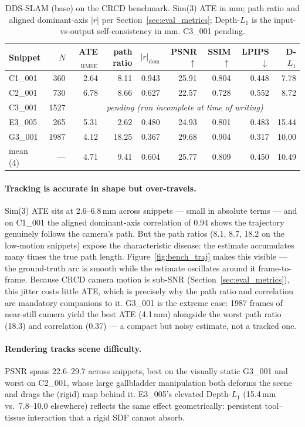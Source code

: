 \begin{table}[t]
\centering
\caption{DDS-SLAM (base) on the CRCD benchmark. Sim(3) ATE in mm; path ratio and
aligned dominant-axis $|r|$ per Section~\ref{sec:eval_metrics}; Depth-$L_1$ is the
input-vs-output self-consistency in mm. C3\_001 pending.}
\label{tab:bench_dds}
\small
\begin{tabular}{lrrrrrrrr}
\toprule
Snippet & $N$ & ATE$_{\mathrm{RMSE}}$ & path ratio & $|r|_{\mathrm{dom}}$ &
PSNR$\uparrow$ & SSIM$\uparrow$ & LPIPS$\downarrow$ & D-$L_1$ \\
\midrule
C1\_001 &  360 & 2.64 &  8.11 & 0.943 & 25.91 & 0.804 & 0.448 &  7.78 \\
C2\_001 &  730 & 6.78 &  8.66 & 0.627 & 22.57 & 0.728 & 0.552 &  8.72 \\
C3\_001 & 1527 & \multicolumn{7}{c}{\emph{pending (run incomplete at time of writing)}} \\
E3\_005 &  265 & 5.31 &  2.62 & 0.480 & 24.93 & 0.801 & 0.483 & 15.44 \\
G3\_001 & 1987 & 4.12 & 18.25 & 0.367 & 29.68 & 0.904 & 0.317 & 10.00 \\
\midrule
mean (4) & --- & 4.71 & 9.41 & 0.604 & 25.77 & 0.809 & 0.450 & 10.49 \\
\bottomrule
\end{tabular}
\end{table}

\paragraph{Tracking is accurate in shape but over-travels.}
Sim(3) ATE sits at 2.6--6.8\,mm across snippets --- small in absolute terms ---
and on C1\_001 the aligned dominant-axis correlation of $0.94$ shows the
trajectory genuinely follows the camera's path. But the path ratios (8.1, 8.7,
18.2 on the low-motion snippets) expose the characteristic disease: the estimate
accumulates many times the true path length. Figure~\ref{fig:bench_traj}
makes this visible --- the ground-truth arc is smooth while the estimate
oscillates around it frame-to-frame. Because CRCD camera motion is sub-SNR
(Section~\ref{sec:eval_metrics}), this jitter costs little ATE, which is
precisely why the path ratio and correlation are mandatory companions to it.
G3\_001 is the extreme case: 1987 frames of near-still camera yield the best
ATE (4.1\,mm) alongside the worst path ratio (18.3) and correlation (0.37) ---
a compact but noisy estimate, not a tracked one.

\paragraph{Rendering tracks scene difficulty.}
PSNR spans 22.6--29.7 across snippets, best on the visually static G3\_001
and worst on C2\_001, whose large gallbladder manipulation both deforms the
scene and drags the (rigid) map behind it. E3\_005's elevated Depth-$L_1$
(15.4\,mm vs.\ 7.8--10.0 elsewhere) reflects the same effect geometrically:
persistent tool--tissue interaction that a rigid SDF cannot absorb.

